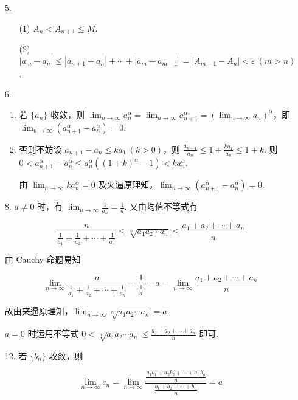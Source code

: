\documentclass[oneside]{ctexbook} %
\begin{document}
\begin{enumerate}
    \item[5.]
    \begin{enumerate}
        \item[(1)]
        $A_n < A_{n+1} \leqslant M$.
        \item[(2)]
        $|a_m - a_n| \leqslant |a_{n+1}-a_n|+\cdots+|a_m-a_{m-1}| = |A_{m-1}-A_n| < \varepsilon \ (m>n)$.
    \end{enumerate}
    \item[6.]
    \begin{enumerate}
        \item
        若 $\{ a_n \}$ 收敛，则 $\displaystyle\lim_{n \to \infty} a_n^{\alpha} = \lim_{n \to \infty} a_{n+1}^{\alpha} = \left(\lim_{n \to \infty} a_n\right)^{\alpha}$，即 $\displaystyle\lim_{n \to \infty} \left(a_{n+1}^{\alpha}-a_n^{\alpha}\right) = 0$.
        \item
        否则不妨设 $a_{n+1}-a_n \leqslant k a_1 \ (k>0)$，则 $\frac{a_{n+1}}{a_n} \leqslant 1 + \frac{ka_1}{a_n} \leqslant 1 + k$.
        则 $0 < a_{n+1}^{\alpha}-a_n^{\alpha} \leqslant a_n^{\alpha}\left((1+k)^{\alpha}-1 \right) < k a_n^{\alpha}$.
        
        由 $\displaystyle\lim_{n \to \infty} ka_n^{\alpha} = 0$ 及夹逼原理知，$\displaystyle\lim_{n \to \infty} \left(a_{n+1}^{\alpha}-a_n^{\alpha}\right) = 0$.
    \end{enumerate}
    \item[8.]
    $a \neq 0$ 时，有 $\displaystyle\lim_{n \to \infty} \frac 1 {a_n} = \frac 1 a$. 又由均值不等式有
    
    $$
    \frac{n}{\frac 1 {a_1} + \frac 1 {a_2} + \cdots + \frac 1 {a_n}} \leqslant \sqrt[n]{a_1a_2\cdots a_n} \leqslant \frac {a_1+a_2+\cdots+a_n} n
    $$
    
    由 Cauchy 命题易知
    
    $$
    \lim_{n \to \infty} \frac{n}{\frac 1 {a_1} + \frac 1 {a_2} + \cdots + \frac 1 {a_n}} = \frac 1 {\frac 1 a} = a = \lim_{n \to \infty} \frac {a_1+a_2+\cdots+a_n} n
    $$
    
    故由夹逼原理知，$\displaystyle\lim_{n \to \infty} \sqrt[n]{a_1a_2\cdots a_n} = a$.
    
    $a = 0$ 时运用不等式 $0 < \sqrt[n]{a_1a_2\cdots a_n} \leqslant \frac {a_1+a_2+\cdots+a_n} n$ 即可.
    \item[12.]
    若 $\{ b_n \}$ 收敛，则
    
    $$
    \lim_{n \to \infty} c_n = \lim_{n \to \infty} \frac{\frac {a_1b_1+a_2b_2+\cdots+a_nb_n} n}{\frac {b_1+b_2+\cdots+b_n} n} = a
    $$
     

\end{enumerate}
\end{document}

